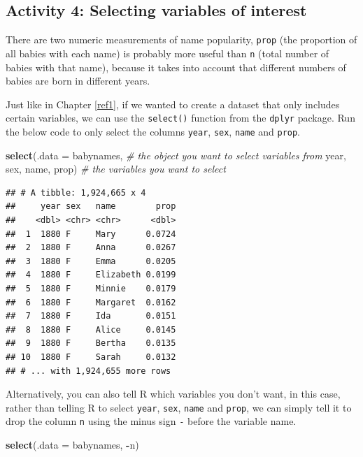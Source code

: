 \documentclass[]{book}
\newenvironment{Shaded}{\begin{snugshade}}{\end{snugshade}}
\newcommand{\CommentTok}[1]{\textcolor[rgb]{0.56,0.35,0.01}{\textit{#1}}}
\newcommand{\DataTypeTok}[1]{\textcolor[rgb]{0.13,0.29,0.53}{#1}}
\newcommand{\KeywordTok}[1]{\textcolor[rgb]{0.13,0.29,0.53}{\textbf{#1}}}
\newcommand{\NormalTok}[1]{#1}
\newcommand{\OperatorTok}[1]{\textcolor[rgb]{0.81,0.36,0.00}{\textbf{#1}}}
\begin{document}
\hypertarget{activity-4-selecting-variables-of-interest}{%
\subsection{Activity 4: Selecting variables of interest}\label{activity-4-selecting-variables-of-interest}}

There are two numeric measurements of name popularity, \texttt{prop} (the proportion of all babies with each name) is probably more useful than \texttt{n} (total number of babies with that name), because it takes into account that different numbers of babies are born in different years.

Just like in Chapter \ref{ref1}, if we wanted to create a dataset that only includes certain variables, we can use the \texttt{select()} function from the \texttt{dplyr} package. Run the below code to only select the columns \texttt{year}, \texttt{sex}, \texttt{name} and \texttt{prop}.

\begin{Shaded}
\begin{Highlighting}[]
\KeywordTok{select}\NormalTok{(}\DataTypeTok{.data =}\NormalTok{ babynames, }\CommentTok{# the object you want to select variables from}
\NormalTok{       year, sex, name, prop) }\CommentTok{# the variables you want to select}
\end{Highlighting}
\end{Shaded}

\begin{verbatim}
## # A tibble: 1,924,665 x 4
##     year sex   name        prop
##    <dbl> <chr> <chr>      <dbl>
##  1  1880 F     Mary      0.0724
##  2  1880 F     Anna      0.0267
##  3  1880 F     Emma      0.0205
##  4  1880 F     Elizabeth 0.0199
##  5  1880 F     Minnie    0.0179
##  6  1880 F     Margaret  0.0162
##  7  1880 F     Ida       0.0151
##  8  1880 F     Alice     0.0145
##  9  1880 F     Bertha    0.0135
## 10  1880 F     Sarah     0.0132
## # ... with 1,924,655 more rows
\end{verbatim}

Alternatively, you can also tell R which variables you don't want, in this case, rather than telling R to select \texttt{year}, \texttt{sex}, \texttt{name} and \texttt{prop}, we can simply tell it to drop the column \texttt{n} using the minus sign \texttt{-} before the variable name.

\begin{Shaded}
\begin{Highlighting}[]
\KeywordTok{select}\NormalTok{(}\DataTypeTok{.data =}\NormalTok{ babynames, }\OperatorTok{-}\NormalTok{n)}
\end{Highlighting}
\end{Shaded}
\end{document}

